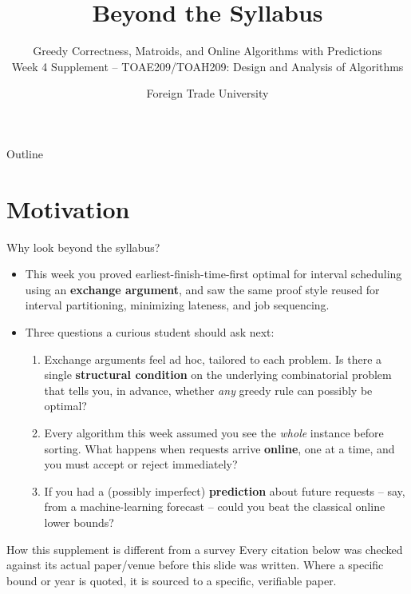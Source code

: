 \documentclass[11pt,aspectratio=169]{beamer}
\title{Beyond the Syllabus}
\subtitle{Greedy Correctness, Matroids, and Online Algorithms with Predictions\\
\small Week 4 Supplement -- TOAE209/TOAH209: Design and Analysis of Algorithms}
\author{Foreign Trade University}
\date{}
\begin{document}
\begin{frame}
  \titlepage
\end{frame}

\begin{frame}{Outline}
  \tableofcontents
\end{frame}

\section{Motivation}

\begin{frame}{Why look beyond the syllabus?}
  \begin{itemize}
    \item This week you proved earliest-finish-time-first optimal for interval
    scheduling using an \textbf{exchange argument}, and saw the same proof style reused
    for interval partitioning, minimizing lateness, and job sequencing.
    \item Three questions a curious student should ask next:
    \begin{enumerate}
      \item Exchange arguments feel ad hoc, tailored to each problem. Is there a single
      \textbf{structural condition} on the underlying combinatorial problem that tells
      you, in advance, whether \emph{any} greedy rule can possibly be optimal?
      \item Every algorithm this week assumed you see the \emph{whole} instance before
      sorting. What happens when requests arrive \textbf{online}, one at a time, and you
      must accept or reject immediately?
      \item If you had a (possibly imperfect) \textbf{prediction} about future requests
      -- say, from a machine-learning forecast -- could you beat the classical online
      lower bounds?
    \end{enumerate}
  \end{itemize}
  \begin{alertblock}{How this supplement is different from a survey}
    Every citation below was checked against its actual paper/venue before this slide
    was written. Where a specific bound or year is quoted, it is sourced to a specific,
    verifiable paper.
  \end{alertblock}
\end{frame}
\end{document}
